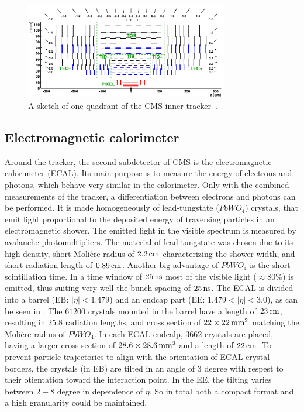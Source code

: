 \begin{figure}[tbp]
 \centering
 \includegraphics[width=0.79\textwidth]{figures/general/tracker.pdf}
 \caption{A sketch of one quadrant of the CMS inner tracker~\cite{TrackerPDFPic}.}
 \label{fig:tracker}
\end{figure}

\subsection{Electromagnetic calorimeter}
Around the tracker, the second subdetector of CMS is the electromagnetic calorimeter (ECAL). Its main purpose is to measure the energy of electrons and photons, which behave very similar in the calorimeter. Only with the combined measurements of the tracker, a differentiation between electrons and photons can be performed. It is made homogeneously of lead-tungstate ($PbWO_4$) crystals, that emit light proportional to the deposited energy of traversing particles in an electromagnetic shower. The emitted light in the visible spectrum is measured by avalanche photomultipliers. The material of lead-tungstate was chosen due to its high density, short Moli\`{e}re radius of $2.2\,\text{cm}$ characterizing the shower width, and short radiation length of $0.89\,\text{cm}$. Another big advantage of $PbWO_4$ is the short scintillation time. In a time window of $25\,\text{ns}$ most of the visible light ($\approx80\%$) is emitted, thus suiting very well the bunch spacing of $25\,\text{ns}$. The ECAL is divided into a barrel (EB: $|\eta|<1.479$) and an endcap part (EE: $1.479<|\eta|<3.0$), as can be seen in . The $61200$ crystals mounted in the barrel have a length of $23\,\text{cm}$, resulting in $25.8$ radiation lengths, and cross section of $22\times22\,\text{mm}^2$ matching the Moli\`{e}re radius of $PbWO_4$. In each ECAL endcalp, $3662$ crystals are placed, having a larger cross section of $ 28.6\times28.6\,\text{mm}^2$ and a length of $22\,\text{cm}$.
To prevent particle trajectories to align with the orientation of ECAL crystal borders, the crystals (in EB) are tilted in an angle of $3$ degree with respest to their otientation toward the interaction point. In the EE, the tilting varies between $2-8$ degree in dependence of $\eta$. So in total both a compact format and a high granularity could be maintained.\\
